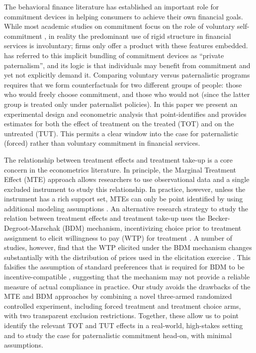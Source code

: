 \documentclass[11pt, a4paper]{article}
\begin{document}
The behavioral finance literature has established an important role for commitment devices in helping consumers to achieve their own financial goals.  While most academic studies on commitment focus on the role of voluntary self-commitment \citep{thaler2004save, prina2015banking, brune2016facilitating, callen2019headwaters, Pascaline, Ashraf}, in reality the predominant use of rigid structure in financial services is involuntary; firms only offer a product with these features embedded.  \cite{Laibson2018} has referred to this implicit bundling of commitment devices as ``private paternalism'', and its logic is that individuals may benefit from commitment and yet not explicitly demand it.  Comparing voluntary versus paternalistic programs requires that we form counterfactuals for two different groups of people: those who would freely choose commitment, and those who would not (since the latter group is treated only under paternalist policies). In this paper we present an experimental design and econometric analysis that point-identifies and provides estimates for both the effect of treatment on the treated (TOT) and on the untreated (TUT). This permits a clear window into the case for paternalistic (forced) rather than voluntary commitment in financial services.

The relationship between treatment effects and treatment take-up is a core concern in the econometrics literature. In principle, the Marginal Treatment Effect (MTE) approach allows researchers to use observational data and a single excluded instrument to study this relationship. In practice, however, unless the instrument has a rich support set, MTEs can only be point identified by using additional modeling assumptions \citep{mogstad2018using}. An alternative research strategy to study the relation between treatment effects and treatment take-up uses the Becker-Degroot-Marschak (BDM) mechanism, incentivizing choice prior to treatment assignment to elicit willingness to pay (WTP) for treatment \citep{becker1964measuring}. 
A number of studies, however, find that the WTP elicited under the BDM mechanism changes substantially with the distribution of prices used in the elicitation exercise \citep{bohm1997eliciting,banerji2014detection}. This falsifies the assumption of standard preferences that is required for BDM to be incentive-compatible \cite{mamadehussene2023reliability}, suggesting that the mechanism may not provide a reliable measure of actual compliance  in practice.
Our study avoids the drawbacks of the MTE and BDM approaches by combining a novel three-armed randomized controlled experiment, including forced treatment and treatment choice arms, with two transparent exclusion restrictions. Together, these allow us to point identify the relevant TOT and TUT effects in a real-world, high-stakes setting and to study the case for paternalistic commitment head-on, with minimal assumptions.
\end{document}
